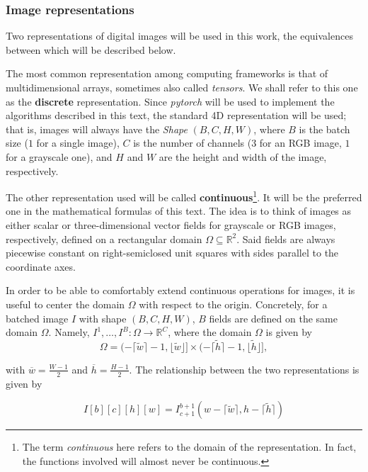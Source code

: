 \documentclass[twocolumn,twoside,a4paper,10pt]{IEEEtran}
\begin{document}
\subsubsection{Image representations}

Two representations of digital images will be used in this work, the equivalences between which will be described below.

The most common representation among computing frameworks is that of multidimensional arrays, sometimes also called \textit{tensors}. We shall refer to this one as the \textbf{discrete} representation. Since \textit{pytorch} will be used to implement the algorithms described in this text, the standard 4D representation will be used; that is, images will always have the \textit{Shape} \((B, C, H, W)\), where \(B\) is the batch size (\(1\) for a single image), \(C\) is the number of channels (\(3\) for an RGB image, \(1\) for a grayscale one), and \(H\) and \(W\) are the height and width of the image, respectively.

The other representation used will be called \textbf{continuous}\footnote{The term \textit{continuous} here refers to the domain of the representation. In fact, the functions involved will almost never be continuous.}. It will be the preferred one in the mathematical formulas of this text. The idea is to think of images as either scalar or three-dimensional vector fields for grayscale or RGB images, respectively, defined on a rectangular domain \(\Omega\subseteq \mathbb{R}^2\). Said fields are always piecewise constant on right-semiclosed unit squares with sides parallel to the coordinate axes.

In order to be able to comfortably extend continuous operations for images, it is useful to center the domain \(\Omega\) with respect to the origin. Concretely, for a batched image \(I\) with shape \((B, C, H, W)\), \(B\)  fields are defined on the same domain \(\Omega\). Namely, \(I^1, \dots, I^B\colon\Omega\to \mathbb{R}^C\), where the domain \(\Omega\) is given by
\[
  \Omega = (-\lceil \tilde{w}\rceil - 1, \lfloor \tilde{w}\rfloor]\times(-\lceil \tilde{h}\rceil -1, \lfloor \tilde{h}\rfloor]
,\]

with \(\overline{w}=\frac{W-1}{2}\) and \(\overline{h}=\frac{H-1}{2}\). The relationship between the two representations is given by

\begin{equation}\label{eq:discrete-continuous}
  I[b][c][h][w] = I^{b+1}_{c+1}(w - \lceil\tilde{w}\rceil, h - \lceil\tilde{h}\rceil)
\end{equation}
\end{document}
